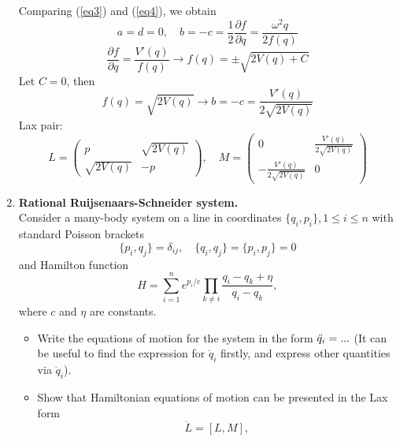\documentclass[12pt]{article}
\theoremstyle{definition}
\begin{document}
\begin{enumerate}
    Comparing (\ref{eq3}) and (\ref{eq4}), we obtain
    \begin{equation}
        a=d=0,\quad b=-c=\frac{1}{2}\frac{\partial f}{\partial q}=\frac{\omega^2q}{2f(q)}
    \end{equation}
    \begin{equation}
        \frac{\partial f}{\partial q}=\frac{V'(q)}{f(q)}\rightarrow f(q)=\pm\sqrt{2V(q)+C}
    \end{equation}
    Let $C=0$, then
    \begin{equation}
        f(q)=\sqrt{2V(q)}\rightarrow b=-c=\frac{V'(q)}{2\sqrt{2V(q)}}
    \end{equation}
    Lax pair:
    \begin{equation}
        \boxed{L=\begin{pmatrix}
            p & \sqrt{2V(q)}\\
            \sqrt{2V(q)} & -p
        \end{pmatrix},\quad M=\begin{pmatrix}
            0 & \frac{V'(q)}{2\sqrt{2V(q)}}\\
            -\frac{V'(q)}{2\sqrt{2V(q)}} & 0
        \end{pmatrix}}
    \end{equation}
    \item \textbf{Rational Ruijsenaars-Schneider system.}\\
    Consider a many-body system on a line in coordinates $\{q_i,p_i\}, 1\leq i\leq n$ with standard Poisson brackets
    \begin{equation}
        \{p_i,q_j\}=\delta_{ij},\quad\{q_i,q_j\}=\{p_i,p_j\}=0
    \end{equation}
    and Hamilton function
    \begin{equation}
        H=\sum\limits_{i=1}^n e^{p_i/c}\prod\limits_{k\neq i}\frac{q_i-q_k+\eta}{q_i-q_k},
    \end{equation}
    where $c$ and $\eta$ are constants.
    \begin{itemize}
        \item Write the equations of motion for the system in the form $\Ddot{q}_i=...$ (It can be useful to find the expression for $\dot{q}_i$ firstly, and express other quantities via $\dot{q}_i$).
        \item Show that Hamiltonian equations of motion can be presented in the Lax form
        \begin{equation}
            \dot{L}=[L,M],
        \end{equation}

\end{itemize}
\end{enumerate}
\end{document}
